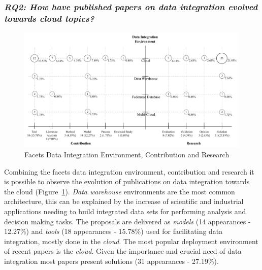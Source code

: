 \subsubsection{\textit{RQ2: How have published papers on data integration evolved towards cloud topics?}}
\begin{figure}[h]
\centering
\includegraphics[width=0.99\textwidth]{figs/bubble-charts/DI-Environment-Contribution-Research.pdf}

\caption{Facets Data Integration Environment, Contribution and Research}\label{fig:facet2}
\end{figure}

Combining the facets data integration environment, contribution
and research it is possible to observe  the evolution of publications on data integration towards the cloud (Figure~\ref{fig:facet2}).  {\em Data warehouse} environments are the most common architecture, this can be explained by the increase of scientific  and industrial applications needing to build integrated  data sets for performing analysis and decision making tasks. The proposals are delivered as {\em models}  (14  appearances - 12.27\%)  and {\em tools} (18
appearances - 15.78\%)  used for facilitating data integration, mostly done in the {\em cloud}.  The most popular deployment environment of recent papers is the {\em cloud}. Given the importance and crucial need of data integration  most papers present solutions (31 appearances - 27.19\%).

